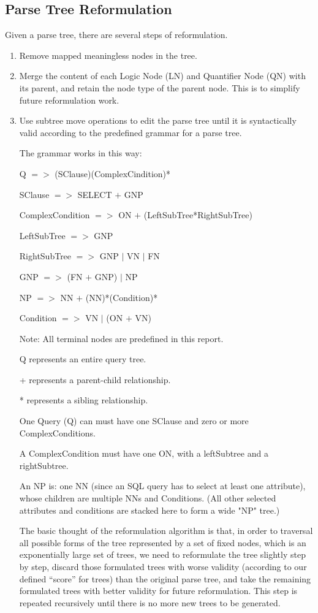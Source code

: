 \documentclass[twocolumn]{article}
\begin{document}
\subsection{Parse Tree Reformulation}
Given a parse tree, there are several steps of reformulation.
\begin{enumerate}
	\item Remove mapped meaningless nodes in the tree.
	
	\item Merge the content of each Logic Node (LN) and Quantifier Node (QN) with its parent, and retain the node type of the parent node. This is to simplify future reformulation work.
	
	\item Use subtree move operations to edit the parse tree until it is syntactically valid according to the predefined grammar for a parse tree.
	
	The grammar works in this way:
	
	Q $=>$ (SClause)(ComplexCindition)*
	
	SClause $=>$ SELECT $+$ GNP
	
	ComplexCondition $=>$ ON $+$ (LeftSubTree*RightSubTree)
	
	LeftSubTree $=>$ GNP
	
	RightSubTree $=>$ GNP $|$ VN $|$ FN
	
	GNP $=>$ (FN $+$ GNP) $|$ NP
	
	NP $=>$ NN $+$ (NN)*(Condition)*
	
	Condition $=>$ VN $|$ (ON $+$ VN)
	
	Note:
	All terminal nodes are predefined in this report.
	
	Q represents an entire query tree.
	
	+ represents a parent-child relationship.
	
	* represents a sibling relationship.
	
	One Query (Q) can must have one SClause and zero or more ComplexConditions.
	
	A ComplexCondition must have one ON, with a leftSubtree and a rightSubtree.
	
	An NP is: one NN (since an SQL query has to select at least one attribute), whose children are multiple NNs and Conditions. (All other selected attributes and conditions are stacked here to form a wide "NP" tree.)
	
	The basic thought of the reformulation algorithm is that, in order to traversal all possible forms of the tree represented by a set of fixed nodes, which is an exponentially large set of trees, we need to reformulate the tree slightly step by step, discard those formulated trees with worse validity (according to our defined ``score'' for trees) than the original parse tree, and take the remaining formulated trees with better validity for future reformulation. This step is repeated recursively until there is no more new trees to be generated.
	

\end{enumerate}
\end{document}
